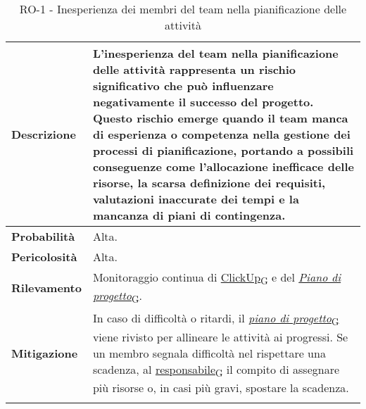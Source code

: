 \begin{longtable}{ | l | p{12cm} | }
	\hline
	\textbf{Descrizione}  & L'inesperienza del team nella pianificazione delle attività rappresenta un rischio significativo che può influenzare negativamente il successo del progetto. Questo rischio emerge quando il team manca di esperienza o competenza nella gestione dei processi di pianificazione, portando a possibili conseguenze come l'allocazione inefficace delle risorse, la scarsa definizione dei requisiti, valutazioni inaccurate dei tempi e la mancanza di piani di contingenza. \\
	\hline
	\textbf{Probabilità}  & Alta.                                                                                                                                                                                                                                                                                                                                                                                                                                                                        \\
	\hline
	\textbf{Pericolosità} & Alta.                                                                                                                                                                                                                                                                                                                                                                                                                                                                        \\
	\hline
	\textbf{Rilevamento}  & Monitoraggio continua di \href{https://7last.github.io/docs/rtb/documentazione-interna/glossario\#clickup}{ClickUp\textsubscript{G}} e del \href{https://7last.github.io/docs/rtb/documentazione-interna/glossario#piano-di-progetto}{\textit{Piano di progetto}\textsubscript{G}}.                                                                                                                                                                                                                                                                                              \\
	\hline
	\textbf{Mitigazione}  & In caso di difficoltà o ritardi, il \href{https://7last.github.io/docs/rtb/documentazione-interna/glossario#piano-di-progetto}{\textit{piano di progetto}\textsubscript{G}} viene rivisto per allineare le attività ai progressi. Se un membro segnala difficoltà nel rispettare una scadenza, al \href{https://7last.github.io/docs/rtb/documentazione-interna/glossario\#responsabile}{responsabile\textsubscript{G}} il compito di assegnare più risorse o, in casi più gravi, spostare la scadenza.                                                                               \\
	\hline
	\caption{RO-1 - Inesperienza dei membri del team nella pianificazione delle attività}

\end{longtable}

